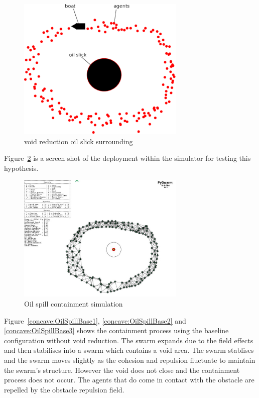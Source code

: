 \documentclass[preprint,12pt]{elsarticle}
\begin{document}
\begin{figure}
\begin{center}
\includegraphics[width=8cm]{figures/OilSlick}
\end{center}
\caption{void reduction oil slick surrounding\label{voids:OilSlick}}
\end{figure}

Figure~\ref{concave:OilSpillSimulation} is a screen shot of the deployment within the simulator for testing this hypothesis. 

\begin{figure}
\begin{center}
\includegraphics[width=8cm]{figures/OilSpillSimulator}
\end{center}
\caption{Oil spill containment simulation\label{concave:OilSpillSimulation}}
\end{figure}

Figure~\ref{concave:OilSpillBase1}, \ref{concave:OilSpillBase2} and \ref{concave:OilSpillBase3} shows the containment process using the baseline configuration without void reduction. The swarm expands due to the field effects and then stabilises into a swarm which contains a void area. The swarm stablises and the swarm moves slightly as the cohesion and repulsion fluctuate to maintain the swarm's structure. However the void does not close and the containment process does not occur. The agents that do come in contact with the obstacle are repelled by the obstacle repulsion field.
\end{document}
